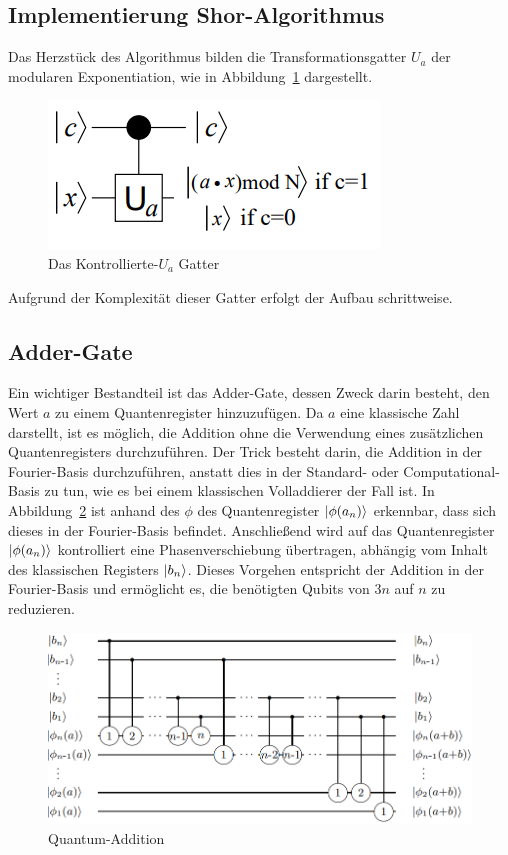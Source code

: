 \documentclass[
  a4paper, %
  10pt, %
  unnumberedsections, %
  twoside, %
]{LTJournalArticle}
\begin{document}
\subsection{\Large Implementierung Shor-Algorithmus}
Das Herzstück des Algorithmus bilden die Transformationsgatter \(U_a\) der modularen Exponentiation,
wie in Abbildung~\ref{fig:c-Ugate} dargestellt.
\begin{figure}[h]
\caption{Das Kontrollierte-\(U_a\) Gatter~\autocite{beauregard2003circuit}}
\label{fig:c-Ugate}
\includegraphics[scale=0.8]{c-Ugate.PNG}
\centering
\end{figure}
Aufgrund der Komplexität dieser Gatter erfolgt der Aufbau schrittweise.
\subsection{\large Adder-Gate}
Ein wichtiger Bestandteil ist das Adder-Gate, dessen Zweck darin besteht,
den Wert \(a\) zu einem Quantenregister hinzuzufügen.
Da \(a\) eine klassische Zahl darstellt, ist es möglich,
die Addition ohne die Verwendung eines zusätzlichen Quantenregisters durchzuführen.
Der Trick besteht darin, die Addition in der Fourier-Basis durchzuführen,
anstatt dies in der Standard- oder Computational-Basis zu tun,
wie es bei einem klassischen Volladdierer der Fall ist.
In Abbildung~\ref{fig:Quantum-Addition} ist anhand des \(\phi\) des Quantenregister \(\ket{\phi(a_n)}\) erkennbar,
dass sich dieses in der Fourier-Basis befindet.
Anschließend wird auf das Quantenregister \(\ket{\phi(a_n)}\) kontrolliert eine Phasenverschiebung übertragen,
abhängig vom Inhalt des klassischen Registers \(\ket{b_n}\).
Dieses Vorgehen entspricht der Addition in der Fourier-Basis und ermöglicht es,
die benötigten Qubits von \(3n\) auf \(n\) zu reduzieren.
\begin{figure}[h]
\caption{Quantum-Addition~\autocite{draper2000addition}}
\label{fig:Quantum-Addition}
\includegraphics[scale=0.4]{Quantum-Addition.PNG}
\centering
\end{figure}
\end{document}

